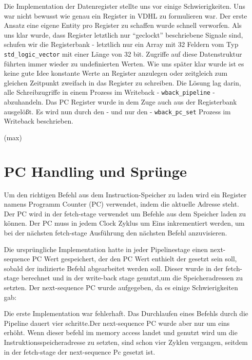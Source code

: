 \documentclass[paper=a4,fontsize=12pt,twocolumn]{scrreprt}
\begin{document}
Die Implementation der Datenregister stellte uns vor einige Schwierigkeiten.
Uns war nicht bewusst wie genau ein Register in VDHL zu formulieren war.
Der erste Ansatz eine eigene Entity pro Register zu schaffen wurde schnell verworfen.
Als uns klar wurde, dass Register letztlich nur \enquote{geclockt} beschriebene Signale sind, schufen wir die Registerbank - letztlich nur ein Array mit 32 Feldern vom  Typ \texttt{std\_logic\_vector} mit einer Länge von 32 bit.
Zugriffe auf diese Datenstruktur führten immer wieder zu undefinierten Werten.
Wie uns später klar wurde ist es keine gute Idee konstante Werte an Register anzulegen oder zeitgleich zum gleichen Zeitpunkt zweifach in das Register zu schreiben.
Die Lösung lag darin, alle Schreibzugriffe in einem Prozess im Writeback - \texttt{wback\_pipeline} - abzuhandeln.
Das PC Register wurde in dem Zuge auch aus der Registerbank ausgelößt.
Es wird nun durch den - und nur den - \texttt{wback\_pc\_set} Prozess im Writeback beschrieben.

(max)

\section{PC Handling und Sprünge}

Um den richtigen Befehl aus dem Instruction-Speicher zu laden wird ein Register namens Programm Counter (PC) verwendet, indem die aktuelle Adresse steht. Der PC wird in der fetch-stage verwendet um Befehle aus dem Speicher laden zu können. Der PC muss in jedem Clock Zyklus um Eins inkrementiert werden, um bei der nächsten fetch-stage Ausführung den nächsten Befehl anzuvisieren. 

Die ursprüngliche Implementation hatte in jeder Pipelinestage einen next-sequence PC Wert gespeichert, der den PC Wert enthielt der gesetzt sein soll, sobald der indizierte Befehl abgearbeitet werden soll. Dieser wurde in der fetch-stage berechnet und in der write-back stage genutzt,um die Speicheradressen zu setzten. 
Der next-sequence PC wurde aufgegeben, da es einige Schwierigkeiten gab:

Die erste Implementation war fehlerhaft. Das Durchlaufen eines Befehls durch die Pipeline dauert vier schritte.Der next-sequence PC wurde aber nur um eins erhöht. Wenn dieser befehl im memory access landet und genutzt wird um die Instruktionsspeicheradresse zu setzten, sind schon vier Zyklen vergangen, seitdem in der fetch-stage der next-sequence Pc gesetzt ist. 
\end{document}
